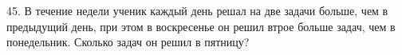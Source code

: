 45. В течение недели ученик каждый день решал на две задачи больше, чем в предыдущий день, при этом в воскресенье он решил втрое больше задач, чем в понедельник. Сколько задач он решил в пятницу?\\
